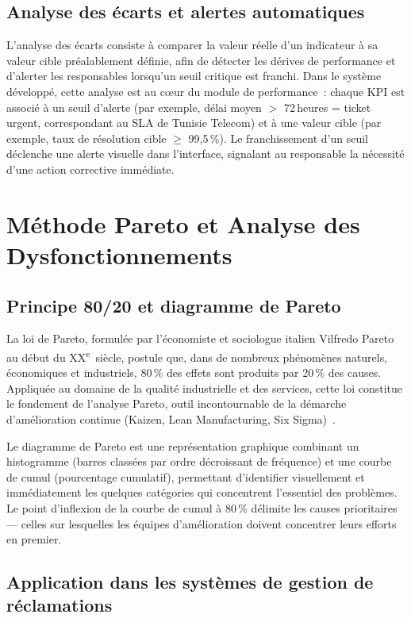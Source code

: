 \documentclass[10pt,a4paper]{report}
\begin{document}
\subsection{Analyse des écarts et alertes automatiques}

L'analyse des écarts consiste à comparer la valeur réelle d'un indicateur à sa valeur cible préalablement définie, afin de détecter les dérives de performance et d'alerter les responsables lorsqu'un seuil critique est franchi. Dans le système développé, cette analyse est au c\oe ur du module de performance~: chaque KPI est associé à un seuil d'alerte (par exemple, délai moyen $>$ 72\,heures = ticket urgent, correspondant au SLA de Tunisie Telecom) et à une valeur cible (par exemple, taux de résolution cible $\geq$ 99,5\,\%). Le franchissement d'un seuil déclenche une alerte visuelle dans l'interface, signalant au responsable la nécessité d'une action corrective immédiate.

\section{Méthode Pareto et Analyse des Dysfonctionnements}

\subsection{Principe 80/20 et diagramme de Pareto}

La loi de Pareto, formulée par l'économiste et sociologue italien Vilfredo Pareto au début du XX\textsuperscript{e}~siècle, postule que, dans de nombreux phénomènes naturels, économiques et industriels, 80\,\% des effets sont produits par 20\,\% des causes. Appliquée au domaine de la qualité industrielle et des services, cette loi constitue le fondement de l'analyse Pareto, outil incontournable de la démarche d'amélioration continue (Kaizen, Lean Manufacturing, Six Sigma)~\cite{imai1986}.

Le diagramme de Pareto est une représentation graphique combinant un histogramme (barres classées par ordre décroissant de fréquence) et une courbe de cumul (pourcentage cumulatif), permettant d'identifier visuellement et immédiatement les quelques catégories qui concentrent l'essentiel des problèmes. Le point d'inflexion de la courbe de cumul à 80\,\% délimite les causes prioritaires --- celles sur lesquelles les équipes d'amélioration doivent concentrer leurs efforts en premier.

\subsection{Application dans les systèmes de gestion de réclamations}
\end{document}

